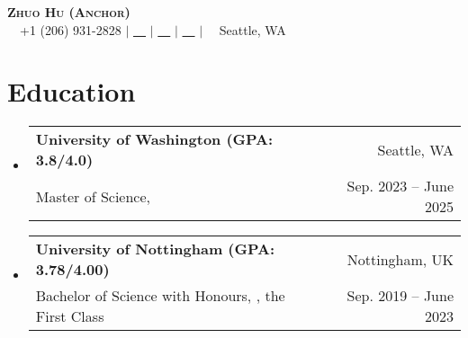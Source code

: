 \documentclass[letterpaper,10pt]{article}
\makeatletter
\newcommand{\link}[1]{\color{myBlue}{#1}}
\newcommand{\resumeSubheading}[4]{
  \vspace{-2pt}\item
    \begin{tabular*}{0.97\textwidth}[t]{l@{\extracolsep{\fill}}r}
      \textbf{#1} & #2 \\
      \small#3 & \small #4 \\
    \end{tabular*}\vspace{-7pt}
}
\newcommand{\resumeSubHeadingListStart}{\begin{itemize}[leftmargin=0.15in, label={}]}
\newcommand{\resumeSubHeadingListEnd}{\end{itemize}}
\makeatother
\begin{document}

\begin{center}
    \textbf{\Huge \scshape Zhuo Hu (Anchor)} \\ \vspace{1pt}
    \small \faMobile \ \ +1 (206) 931-2828 $|$ \href{mailto:uwzhuohu@uw.edu}{\faEnvelope \ \ \link{uwzhuohu@uw.edu}} $|$ 
    \href{https://linkedin.com/in/zhuo-hu}{\faLinkedin \ \ \link{LinkedIn}} $|$
    \href{https://github.com/Anchor-ZhuoHU}{\faGithub \ \ \link{GitHub}} $|$
    \faBuilding \ \ Seattle, WA
\end{center}


\section{Education}
  \resumeSubHeadingListStart
  
    \resumeSubheading
      {University of Washington (GPA: 3.8/4.0)}{Seattle, WA}
      {Master of Science, \href{https://www.ece.uw.edu/}{\link{Electrical and Computer Engineering}}}{Sep. 2023 -- June 2025}
      
    \resumeSubheading
      {University of Nottingham (GPA: 3.78/4.00)}{Nottingham, UK}
      {Bachelor of Science with Honours, \href{https://www.nottingham.ac.uk/mathematics/}{\link{Mathematics with Applied Mathematics}}, the First Class}{Sep. 2019 -- June 2023}
      
  \resumeSubHeadingListEnd


     
\end{document}
